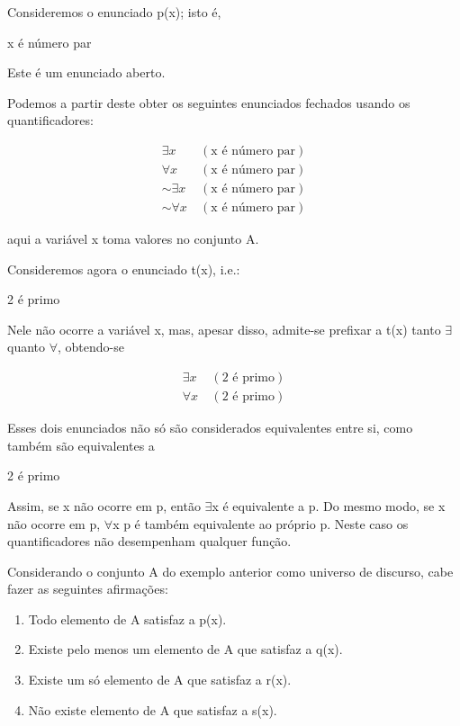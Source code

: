 \noindent Consideremos o enunciado p(x); isto é,

\centerline{x é número par}

\noindent Este é um enunciado aberto.

Podemos a partir deste obter os seguintes enunciados fechados usando os quantificadores:

\begin{align*}
    \exists x\ & (\text{x é número par}) \\
    \forall x\ & (\text{x é número par}) \\
    \sim \exists x\ & (\text{x é número par}) \\
    \sim \forall x\ & (\text{x é número par})
\end{align*}

aqui a variável x toma valores no conjunto A.

\noindent Consideremos agora o enunciado t(x), i.e.:

\centerline{2 é primo}

\noindent Nele não ocorre a variável x, mas, apesar disso, admite-se prefixar a t(x) tanto $\exists$ quanto $\forall$, obtendo-se

\begin{align*}
    \exists x\ & (\text{2 é primo}) \\
    \forall x\ & (\text{2 é primo})
\end{align*}

\noindent Esses dois enunciados não só são considerados equivalentes entre si, como também são equivalentes a

\centerline{2 é primo}

Assim, se x não ocorre em p, então $\exists$x é equivalente a p.
Do mesmo modo, se x não ocorre em p, $\forall$x p é também equivalente ao próprio p.
Neste caso os quantificadores não desempenham qualquer função.

Considerando o  conjunto A do  exemplo anterior como universo de discurso, cabe fazer as seguintes afirmações:

\begin{enumerate}[label=(\roman*)]
    \item Todo elemento de A satisfaz a p(x).
    \item Existe pelo menos um elemento de A que satisfaz a q(x).
    \item Existe um só elemento de A que satisfaz a r(x).
    \item Não existe elemento de A que satisfaz a s(x).
\end{enumerate}

